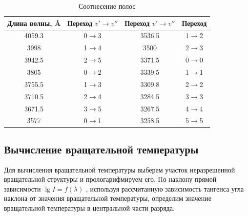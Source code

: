 \begin{table}[H]
	\centering
	\caption{Соотнесение полос}
	\begin{tabular}{|c|c|c|c|}
		\hline
		Длина волны, \AA & Переход $v'\to v''$ & Переход $v'\to v''$ & Переход \bigstrut\\
		\hline
		4059.3 & 0$\to$3 & 3536.5 & 1$\to$2 \bigstrut\\
		\hline
		3998 & 1$\to$4 & 3500 & 2$\to$3 \bigstrut\\
		\hline
		3942.5 & 2$\to$5 & 3371.5 & 0$\to$0 \bigstrut\\
		\hline
		3805 & 0$\to$2 & 3339.5 & 1$\to$1 \bigstrut\\
		\hline
		3755.5 & 1$\to$3 & 3309.8 & 2$\to$2 \bigstrut\\
		\hline
		3710.5 & 2$\to$4 & 3284.5 & 3$\to$3 \bigstrut\\
		\hline
		3671.5 & 3$\to$5 & 3267.5 & 4$\to$4 \bigstrut\\
		\hline
		3577 & 0$\to$1 & 3258.5 & 5$\to$5 \bigstrut\\
		\hline
	\end{tabular}%
	\label{tab:polosi}%
\end{table}%

\subsection{Вычисление вращательной температуры}
Для вычисления вращательной температуры выберем участок неразрешенной
вращательной структуры и прологарифмируем его. По наклону прямой зависимости $\lg I=f(\lambda)$ , используя рассчитанную
зависимость тангенса угла наклона от значения вращательной температуры, определим значение вращательной температуры в центральной части
разряда.